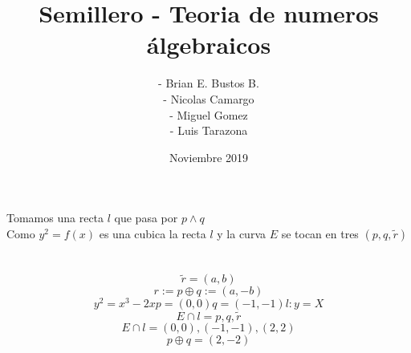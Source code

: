 \documentclass{article}
\title{Semillero - Teoria de numeros álgebraicos}
\author{- Brian E. Bustos B. \\
- Nicolas Camargo \\
- Miguel Gomez \\
- Luis Tarazona }
\date{Noviembre 2019}
\begin{document}
\maketitle

\section{}
Tomamos una recta $l$ que pasa por $p \land q$ \\
Como $y^2 = f(x)$ es una cubica la recta $l$ y la curva $E$ se tocan en tres $(p,q,\widetilde{r})$ 
\section{}
\begin{equation*}
\widetilde{r}=(a,b)     
\end{equation*}
\begin{equation*}
    r:= p \oplus q := (a,-b)
\end{equation*}
\begin{equation*}
    y^2=x^3-2x p=(0,0) q=(-1,-1) l: y=X
\end{equation*}
\begin{equation*}
    E \cap l = {p,q,\widetilde{r}}
\end{equation*}
\begin{equation*}
    E \cap l = {(0,0),(-1,-1),(2,2)}
\end{equation*}
\begin{equation*}
    p \oplus q=(2,-2)
\end{equation*}
\end{document}
